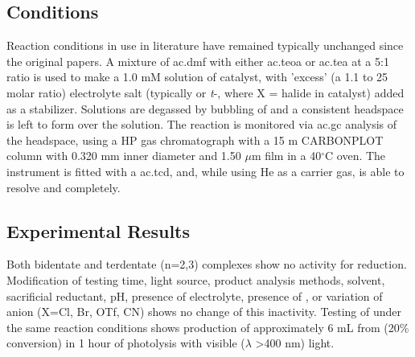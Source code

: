 \subsection{Conditions}

Reaction conditions in use in literature have remained typically unchanged since the original papers. A mixture of \gls{ac.dmf} with either \gls{ac.teoa} or \gls{ac.tea} at a 5:1 ratio is used to make a 1.0 mM solution of catalyst, with 'excess' (a 1.1 to 25 molar ratio) electrolyte salt (typically  or \textit{t}-, where X = halide in catalyst) added as a stabilizer. Solutions are degassed by bubbling of  and a consistent headspace is left to form over the solution. The reaction is monitored via \gls{ac.gc} analysis of the headspace, using a HP gas chromatograph with a 15 m CARBONPLOT column with 0.320 mm inner diameter and 1.50 $\mu$m film in a 40$^\circ$C oven. The instrument is fitted with a \gls{ac.tcd}, and, while using He as a carrier gas, is able to resolve  and  completely.  

\subsection{Experimental Results}

Both bidentate and terdentate  (n=2,3) complexes show no activity for  reduction. Modification of testing time, light source, product analysis methods, solvent, sacrificial reductant, pH, presence of electrolyte, presence of , or variation of anion (X=Cl, Br, OTf, CN) shows no change of this inactivity. Testing of  under the same reaction conditions shows production of approximately 6 mL  from  (20\% conversion) in 1 hour of photolysis with visible ($\lambda$ \textgreater 400 nm) light.


